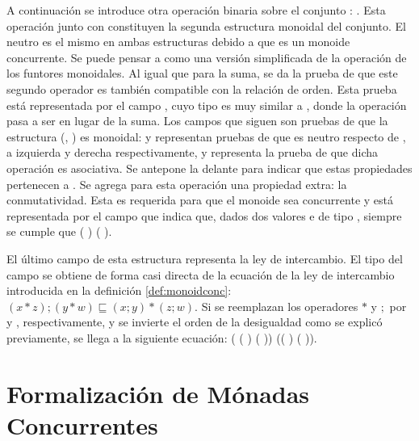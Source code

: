 A continuación se introduce otra operación binaria sobre el conjunto : . Esta operación junto con  constituyen la segunda estructura monoidal del conjunto. El neutro es el mismo en ambas estructuras debido a que es un monoide concurrente. Se puede pensar a  como una versión simplificada de la operación  de los funtores monoidales. Al igual que para la suma, se da la prueba de que este segundo operador es también compatible con la relación de orden. Esta prueba está representada por el campo , cuyo tipo es muy similar a , donde la operación pasa a ser  en lugar de la suma. Los campos que siguen son pruebas de que la estructura (, ) es monoidal:  y  representan pruebas de que  es neutro respecto de , a izquierda y derecha respectivamente, y  representa la prueba de que dicha operación es asociativa. Se antepone la  delante para indicar que estas propiedades pertenecen a . Se agrega para esta operación una propiedad extra: la conmutatividad. Esta es requerida para que el monoide sea concurrente y está representada por el campo  que indica que, dados dos valores  e  de tipo , siempre se cumple que ( )  ( ).

El último campo de esta estructura representa la ley de intercambio. El tipo del campo  se obtiene de forma casi directa de la ecuación de la ley de intercambio introducida en la definición \ref{def:monoidconc}: $(x * z) ; (y * w) \sqsubseteq (x ; y) * (z ; w)$. Si se reemplazan los operadores $*$ y $;$ por  y , respectivamente, y se invierte el orden de la desigualdad como se explicó previamente, se llega a la siguiente ecuación: ( (  ) (  ))  (( )  ( )).

\section{Formalización de Mónadas Concurrentes}\label{form:monconc}

